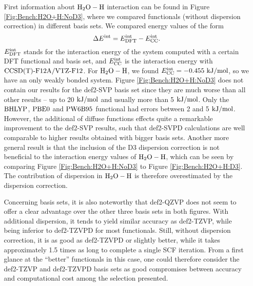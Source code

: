 \documentclass[8.5pt,twoside,twocolumn]{article}
\newcommand\eint{\enmat{E^{\te{int}}}}
\newcommand\dft{\enmat{_{\te{DFT}}}}
\newcommand\kmo{\enmat{\te {kJ/mol}}}
\theoremstyle{standard}
\begin{document}
First information about $\text H _2 \text O-\text H$ interaction can be found in Figure \ref{Fig:Bench:H2O+H:NoD3}, where
we compared functionals (without dispersion correction) in different basis sets. We compared
energy values of the form
\newcommand\ecc{\enmat{\eint_{\te {CC}}}}
\begin{equation}
\Dl\eint=\eint\dft-\ecc.
\label{Bench:RefEnergy}
\end{equation}
$\eint\dft$ stands for the interaction energy of the system computed with a certain
DFT functional and basis set, and $\ecc$ is the interaction energy with $\text{CCSD(T)-F12A}/\text{VTZ-F}12$.
For $\text H _2 \text O-\text H$, we found $\ecc=-0.455 \te{ kJ/mol}$, so we have an only
weakly bonded system. Figure \ref{Fig:Bench:H2O+H:NoD3} does not contain our results
for the def2-SVP basis set since they are much worse than all other results --
up to 20 $\kmo$ and usually more than 5 $\kmo$. Only the $\text{BHLYP}$, $\text{PBE0}$ and
$\text{PW6B95}$ functional had errors between 2 and 5 $\kmo$. However,
the additional of diffuse functions effects quite a remarkable improvement to the
def2-SVP results, such that def2-SVPD calculations are well comparable to higher
results obtained with bigger basis sets. Another more general result is that the inclusion
of the D3 dispersion correction is not beneficial to the interaction
energy values of $\text H _2 \text O-\text H$, which can be seen by comparing Figure \ref{Fig:Bench:H2O+H:NoD3}
to Figure \ref{Fig:Bench:H2O+H:D3}. The contribution of dispersion in $\text H _2 \text O-\text H$
is therefore overestimated by the dispersion correction.

Concerning basis sets, it is also
noteworthy that def2-QZVP does not seem to offer a clear advantage over the
other three basis sets in both figures. With additional dispersion,
it tends to yield similar accuracy as def2-TZVP, while being inferior
to def2-TZVPD for most functionals. Still, without dispersion correction,
it is as good as def2-TZVPD or slightly better, while it takes approximately
1.5 times as long to complete a single SCF iteration. From a first glance
at the ``better'' functionals in this case, one could therefore consider
the def2-TZVP and def2-TZVPD basis sets as good compromises between
accuracy and computational cost among the selection presented. 
\end{document}
